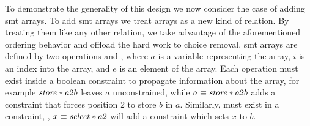 To demonstrate the generality of this design we now consider the case of adding
\ac{smt} arrays. To add \ac{smt} arrays we treat arrays as a new kind of
relation. By treating them like any other relation, we take advantage of the
aforementioned ordering behavior and offload the hard work to choice removal.
\ac{smt} arrays are defined by two operations  and
, where $a$ is a variable representing the array, $i$ is an index
into the array, and $e$ is an element of the array. Each operation must exist
inside a boolean constraint to propagate information about the array, for
example $\mathit{store}*{a}{2}{b}$ leaves $a$ unconstrained, while $a \equiv
\mathit{store}*{a}{2}{b}$ adds a constraint that forces position 2 to store $b$ in $a$.
Similarly, \select{} must exist in a constraint, \eg{}, $x \equiv
\mathit{select}*{a}{2}$ will add a constraint which sets $x$ to $b$.

